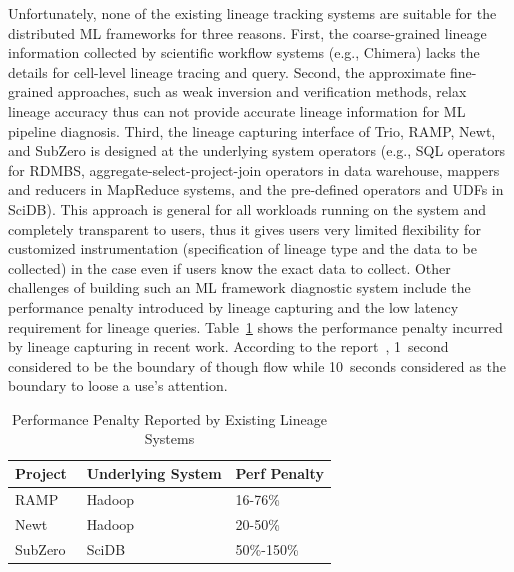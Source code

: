 \documentclass{sig-alternate}
\begin{document}
Unfortunately, none of the existing lineage tracking systems are suitable for the distributed ML frameworks for three reasons.
First, the coarse-grained lineage information collected by scientific workflow systems (e.g., Chimera) lacks the details for cell-level lineage tracing and query.
Second, the approximate fine-grained approaches, such as weak inversion and verification methods, 
relax lineage accuracy thus can not provide accurate lineage information for ML pipeline diagnosis.
Third, the lineage capturing interface of Trio, RAMP, Newt, and SubZero is designed at
the underlying system operators (e.g., SQL operators for RDMBS, aggregate-select-project-join operators in data warehouse, 
mappers and reducers in MapReduce systems, and the pre-defined operators and UDFs in SciDB). 
This approach is general for all workloads running on the system and completely transparent to users, 
thus it gives users very limited flexibility for customized instrumentation (specification of lineage type and the data to be collected) 
in the case even if users know the exact data to collect.
Other challenges of building such an ML framework diagnostic system include the performance penalty introduced by 
lineage capturing and the low latency requirement for lineage queries.
Table~\ref{tb:overhead} shows the performance penalty incurred by lineage capturing in recent work.
According to the report~\cite{nielsen2009}, 1~second considered to be the boundary of though flow while 
10~seconds considered as the boundary to loose a use's attention.

\begin{table}[t]
\begin{center}
    \caption{Performance Penalty Reported by Existing Lineage Systems}
    \begin{scriptsize}
    \begin{tabular}{ | p{1.5cm} | p{3.5cm} | p{2cm} |}
    \hline
    Project & Underlying System & Perf Penalty  \\ \hline \hline
    RAMP~\cite{ikeda11} & Hadoop~\cite{HADOOP} & 16-76\% \\ \hline
    Newt~\cite{logothetis13} & Hadoop~\cite{HADOOP} & 20-50\% \\ \hline
    SubZero~\cite{wu13} & SciDB~\cite{brown10} & 50\%-150\% \\ \hline
    \end{tabular}
    \end{scriptsize}
    \label{tb:overhead}
\end{center}   
\end{table}
\end{document}
